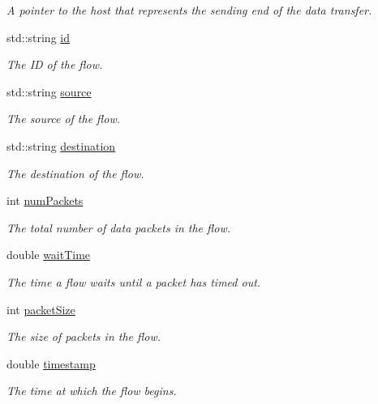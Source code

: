 \begin{DoxyCompactItemize}
\begin{DoxyCompactList}\small\item\em \-A pointer to the host that represents the sending end of the data transfer. \end{DoxyCompactList}\item 
std\-::string \hyperlink{classFlow_a8724a8f4ce94cf7bfb0db79e688ed179}{id}
\begin{DoxyCompactList}\small\item\em \-The \-I\-D of the flow. \end{DoxyCompactList}\item 
std\-::string \hyperlink{classFlow_a36eb3e23b0804647c30be41835b790b3}{source}
\begin{DoxyCompactList}\small\item\em \-The source of the flow. \end{DoxyCompactList}\item 
std\-::string \hyperlink{classFlow_a536685c38def6cf8b61d0fb0d7e8372d}{destination}
\begin{DoxyCompactList}\small\item\em \-The destination of the flow. \end{DoxyCompactList}\item 
int \hyperlink{classFlow_a78d725176506b21ce2355b3742ab8c17}{num\-Packets}
\begin{DoxyCompactList}\small\item\em \-The total number of data packets in the flow. \end{DoxyCompactList}\item 
double \hyperlink{classFlow_a47968d3d4596ad50ce090a0c352a89f5}{wait\-Time}
\begin{DoxyCompactList}\small\item\em \-The time a flow waits until a packet has timed out. \end{DoxyCompactList}\item 
int \hyperlink{classFlow_ac5af37a8637ec606977ebc1e33a0c59b}{packet\-Size}
\begin{DoxyCompactList}\small\item\em \-The size of packets in the flow. \end{DoxyCompactList}\item 
double \hyperlink{classFlow_a502b4455d485a1a0325d21d246183bb1}{timestamp}
\begin{DoxyCompactList}\small\item\em \-The time at which the flow begins. \end{DoxyCompactList}\item 

\end{DoxyCompactItemize}
